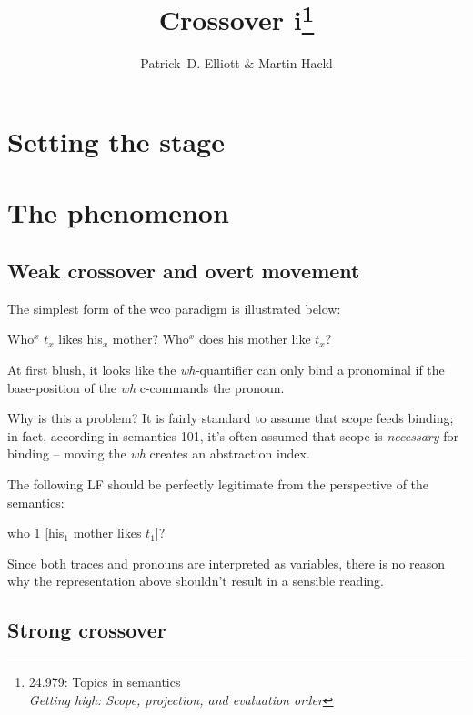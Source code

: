 \documentclass[nols,twoside,nofonts,nobib,nohyper]{tufte-handout}
\title{Crossover i\thanks{24.979: Topics in
    semantics\\\noindent\textit{Getting high: Scope, projection, and evaluation order}}}
\author[Patrick D. Elliott and Martin Hackl]{Patrick~D. Elliott\sidenote{\texttt{pdell@mit.edu}} \& Martin Hackl\sidenote{\texttt{hackl@mit.edu}}}
\begin{document}
\maketitle%

\section{Setting the stage}

\section{The phenomenon}

\subsection{Weak crossover and overt movement}




The simplest form of the \ac{wco} paradigm is illustrated below:

\pex
\a Who$^{x}$ $t_{x}$ likes his$_{x}$ mother?
\a\ljudge{*}Who$^{x}$ does his mother like $t_{x}$?
\xe

At first blush, it looks like the \textit{wh-}quantifier can only bind a
pronominal if the base-position of the \textit{wh} c-commands the pronoun.

Why is this a problem? It is fairly standard to assume that scope feeds binding;
in fact, according in semantics 101, it's often assumed that scope is
\textit{necessary} for binding -- moving the \textit{wh} creates an abstraction
index.

The following LF should be perfectly legitimate from the perspective of the
semantics:

\ex
who $1$ [his$_{1}$ mother likes $t_{1}$]?
\xe

Since both traces and pronouns are interpreted as variables, there is no reason
why the representation above shouldn't result in a sensible reading.

\subsection{Strong crossover}
\end{document}

